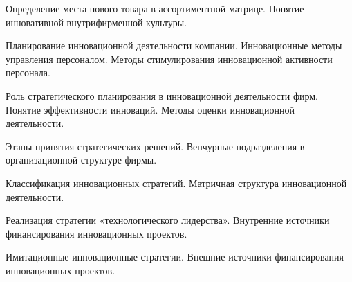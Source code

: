 \documentclass[
	14pt,
	a4paper,
	]
	{scrartcl}
\begin{document}
\shapk
{}
\setcounter{zad}{0}

\vfill
\z Определение места нового товара в ассортиментной матрице.
 \vfill
\z Понятие инновативной внутрифирменной культуры.
 \vfill

\vfill

\newpage


\shapk
{}
\setcounter{zad}{0}

\vfill
\z Планирование инновационной деятельности компании.
 \vfill
\z Инновационные методы управления персоналом. Методы стимулирования инновационной активности персонала.
 \vfill

\vfill

\newpage


\shapk
{}
\setcounter{zad}{0}

\vfill
\z Роль стратегического планирования в инновационной деятельности фирм.
 \vfill
\z Понятие эффективности инноваций. Методы оценки инновационной деятельности.
 \vfill

\vfill

\newpage


\shapk
{}
\setcounter{zad}{0}

\vfill
\z Этапы принятия стратегических решений.
 \vfill
\z Венчурные подразделения в организационной структуре фирмы.
 \vfill

\vfill

\newpage


\shapk
{}
\setcounter{zad}{0}

\vfill
\z Классификация инновационных стратегий.
 \vfill
\z Матричная структура инновационной деятельности.
 \vfill

\vfill

\newpage


\shapk
{}
\setcounter{zad}{0}

\vfill
\z Реализация стратегии «технологического лидерства».
 \vfill
\z Внутренние источники финансирования инновационных проектов.
 \vfill

\vfill

\newpage


\shapk
{}
\setcounter{zad}{0}

\vfill
\z Имитационные инновационные стратегии.
 \vfill
\z Внешние источники финансирования инновационных проектов.
 \vfill

\vfill
\end{document}
